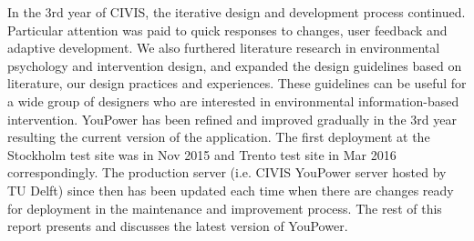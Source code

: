 In the 3rd year of CIVIS, the iterative design and development process continued. Particular attention was paid to quick responses to changes, user feedback and adaptive development. We also furthered literature research in environmental psychology and intervention design, and expanded the design guidelines based on literature, our design practices and experiences. These guidelines can be useful for a wide group of designers who are interested in environmental information-based intervention. YouPower has been refined and improved gradually in the 3rd year resulting the current version of the application. The first deployment at the Stockholm test site was in Nov 2015 and Trento test site in Mar 2016 correspondingly. The production server (i.e. CIVIS YouPower server hosted by TU Delft) since then has been updated each time when there are changes ready for deployment in the maintenance and improvement process.  
The rest of this report presents and discusses the latest version of YouPower. 

 
 

